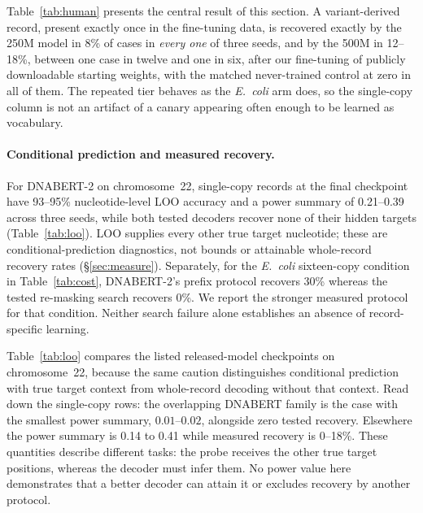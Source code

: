 Table~\ref{tab:human} presents the central result of this section. A variant-derived
record, present exactly once in the fine-tuning data, is recovered exactly by the 250M model in 8\% of cases in \emph{every one} of three seeds, and by the 500M in
12--18\%, between one case in twelve and one in six, after our fine-tuning of publicly downloadable starting weights, with the
matched never-trained control at zero in all of them. The repeated tier
behaves as the \emph{E.~coli} arm does, so the single-copy column is not an artifact of a canary
appearing often enough to be learned as vocabulary.

\paragraph{Conditional prediction and measured recovery.}
For DNABERT-2 on chromosome~22, single-copy records at the final checkpoint have
93--95\% nucleotide-level LOO accuracy and a power summary of 0.21--0.39 across
three seeds, while both tested decoders recover none of their hidden targets
(Table~\ref{tab:loo}). LOO supplies every other true target nucleotide; these are
conditional-prediction diagnostics, not bounds or attainable whole-record recovery
rates (\S\ref{sec:measure}).
Separately, for the \emph{E.~coli} sixteen-copy condition in Table~\ref{tab:cost},
DNABERT-2's prefix protocol recovers 30\% whereas the tested re-masking search
recovers 0\%. We report the stronger measured protocol for that condition.
Neither search failure alone establishes an absence of record-specific learning.

Table~\ref{tab:loo} compares the listed released-model checkpoints on chromosome~22, because the
same caution distinguishes conditional prediction with true target context from whole-record
decoding without that context. Read down the single-copy rows: the overlapping DNABERT family is the
case with the smallest power summary, $0.01$--$0.02$, alongside zero tested recovery.
Elsewhere the power summary is 0.14 to 0.41 while measured recovery is 0--18\%.
These quantities describe different tasks: the probe receives the other true target
positions, whereas the decoder must infer them. No power value here demonstrates that
a better decoder can attain it or excludes recovery by another protocol.

